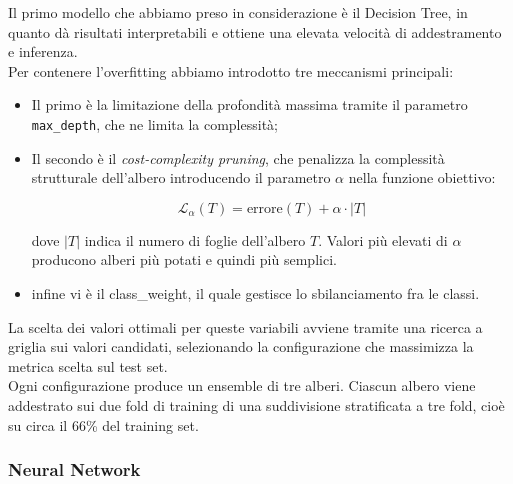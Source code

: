 \documentclass{article}
\begin{document}
Il primo modello che abbiamo preso in considerazione è il Decision Tree, in quanto dà risultati interpretabili e ottiene una elevata velocità di addestramento e inferenza.\\
Per contenere l'overfitting abbiamo introdotto tre meccanismi principali:
\begin{itemize}
    \item Il primo è la limitazione della profondità massima tramite il parametro \texttt{max\_depth}, che ne limita la complessità;
    \item Il secondo è il \textit{cost-complexity pruning}, che penalizza la complessità strutturale dell'albero introducendo il parametro $\alpha$ nella funzione obiettivo:

    \begin{equation}
        \mathcal{L}_\alpha(T) = \text{errore}(T) + \alpha \cdot |T|
    \end{equation}

    dove $|T|$ indica il numero di foglie dell'albero $T$.
    Valori più elevati di $\alpha$ producono alberi più potati e quindi più semplici.
    \item infine vi è il class\_weight, il quale gestisce lo sbilanciamento fra le classi. 
\end{itemize}

La scelta dei valori ottimali per queste variabili avviene tramite una ricerca a griglia sui valori candidati, selezionando la configurazione
che massimizza la metrica scelta sul test set.\\
Ogni configurazione produce un ensemble di tre alberi. Ciascun albero viene addestrato sui due fold di training di una suddivisione stratificata a tre fold, cioè su circa il 66\% del training set.

\subsubsection{Neural Network}
\end{document}

